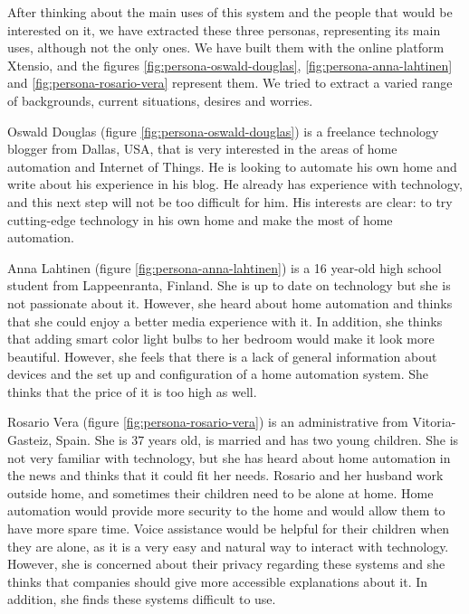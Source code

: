 After thinking about the main uses of this system and the people that would be interested on it, we have extracted these three personas,
representing its main uses, although not the only ones. We have built them with the online platform Xtensio, and the figures
\ref{fig:persona-oswald-douglas}, \ref{fig:persona-anna-lahtinen} and \ref{fig:persona-rosario-vera} represent them. We tried to extract
a varied range of backgrounds, current situations, desires and worries.

Oswald Douglas (figure \ref{fig:persona-oswald-douglas}) is a freelance technology blogger from Dallas, USA, that is very interested
in the areas of home automation and Internet of Things. He is looking to automate his own home and write about his experience in
his blog. He already has experience with technology, and this next step will not be too difficult for him. His interests are clear:
to try cutting-edge technology in his own home and make the most of home automation.

Anna Lahtinen (figure \ref{fig:persona-anna-lahtinen}) is a 16 year-old high school student from Lappeenranta, Finland. She is up
to date on technology but she is not passionate about it. However, she heard about home automation and thinks that she could enjoy
a better media experience with it. In addition, she thinks that adding smart color light bulbs to her bedroom would make it look more
beautiful. However, she feels that there is a lack of general information about devices and the set up and configuration of a home
automation system. She thinks that the price of it is too high as well.

Rosario Vera (figure \ref{fig:persona-rosario-vera}) is an administrative from Vitoria-Gasteiz, Spain. She is 37 years old, is married and
has two young children. She is not very familiar with technology, but she has heard about home automation in the news and thinks
that it could fit her needs. Rosario and her husband work outside home, and sometimes their children need to be alone at home. Home
automation would provide more security to the home and would allow them to have more spare time. Voice assistance would be helpful
for their children when they are alone, as it is a very easy and natural way to interact with technology. However, she is concerned about
their privacy regarding these systems and she thinks that companies should give more accessible explanations about it. In addition,
she finds these systems difficult to use.


